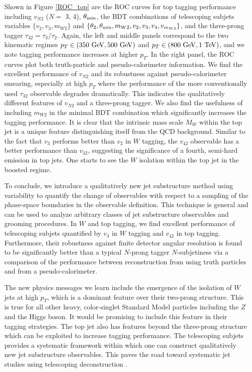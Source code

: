 \documentclass[aps,prl,floatfix,preprintnumbers,twocolumn,groupedaddress,nofootinbib]{revtex4-1}
\begin{document}
Shown in Figure \ref{ROC_top} are the ROC curves for top tagging performance including $v_{N2}$ ($N = $ 3, 4), $\theta_{\rm min}$, the BDT combinations of telescoping subjets variables $\{v_2, v_3, m_{W2}\}$ and $\{\theta_2,\theta_{\rm min},m_{W2},v_2,v_3,v_4,v_{m_{W2}}\}$, and the three-prong tagger $\tau_{32}=\tau_{3}/\tau_{2}$. Again, the left and middle panels correspond to the two kinematic regimes $p_T \in (350~{\rm GeV}, 500~{\rm GeV})$ and $p_T \in (800~{\rm GeV}, 1~{\rm TeV})$, and we note tagging performance increases at higher $p_T$. In the right panel, the ROC curves plot both truth-particle and pseudo-calorimeter information. We find the excellent performance of $v_{N2}$ and its robustness against pseudo-calorimeter smearing, especially at high $p_T$ where the performance of the more conventionally used $\tau_{32}$ observable degrades dramatically. This indicates the qualitatively different features of $v_{N2}$ and a three-prong tagger. We also find the usefulness of including $m_{W2}$ in the minimal BDT combination which significantly increases the tagging performance. It is clear that the intrinsic mass scale $M_W$ within the top jet is a unique feature distinguishing itself from the QCD background. Similar to the fact that $v_3$ performs better than $v_2$ in $W$ tagging, the $v_{42}$ observable has a better performance than $v_{32}$, suggesting the significance of a fourth, semi-hard emission in top jets. One starts to see the $W$ isolation within the top jet in the boosted regime.

To conclude, we introduce a qualitatively new jet substructure method using variability to quantify the change of observables with respect to a sampling of the phase-space boundaries in the observable definition. This technique is general and can be used to analyze arbitrary classes of jet substructure observables and grooming procedures. In $W$ and top tagging, we find excellent performance of telescoping subjets quantified by $v_3$ in $W$ tagging and $v_{42}$ in top tagging. Furthermore, their robustness against finite detector angular resolution is found to be significantly better than a typical $N$-prong tagger $N$-subjetiness via a comparison of the performance between reconstruction from using truth particles and from a pseudo-calorimeter.

The new physics messages we learn include the emergence of the isolation of $W$ jets at high $p_T$, which is a dominant feature over their two-prong structure. This is true for all other heavy, color-singlet Standard Model particles including the $Z$ and the Higgs boson. It would be promising to include this feature in their tagging strategies. The top jet also has features beyond the three-prong structure which can be exploited to increase tagging performance. The telescoping subjets provides a systematic framework within which one can construct qualitatively new jet substructure observables. This paves the road toward systematic jet studies using telescoping deconstruction \cite{Chien:2017hij}.
\end{document}
